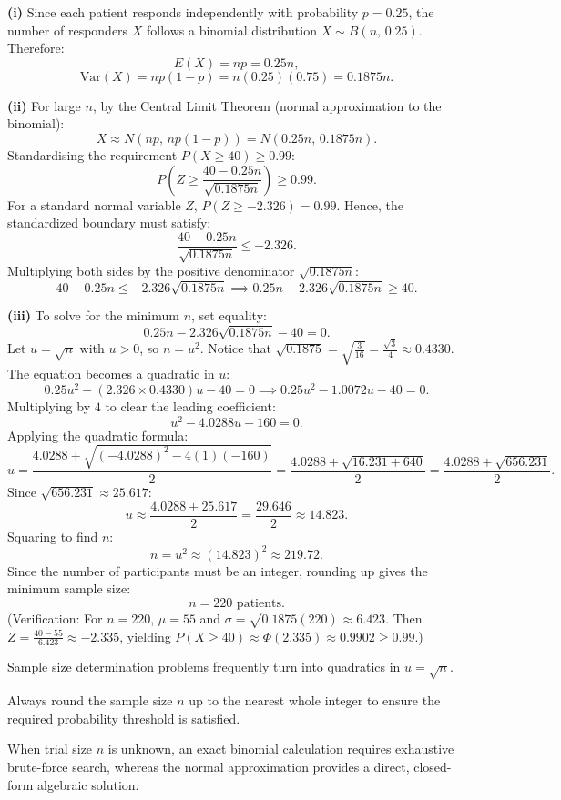 \begin{solution}
\textbf{(i)} Since each patient responds independently with probability $p = 0{.}25$, the number of responders $X$ follows a binomial distribution $X \sim B(n,\, 0{.}25)$. Therefore:
\[
E(X) = np = 0{.}25n,
\]
\[
\mathrm{Var}(X) = np(1-p) = n(0{.}25)(0{.}75) = \boxed{0{.}1875n}.
\]

\textbf{(ii)} For large $n$, by the Central Limit Theorem (normal approximation to the binomial):
\[
X \approx N(np,\, np(1-p)) = N(0{.}25n,\, 0{.}1875n).
\]
Standardising the requirement $P(X \geq 40) \geq 0{.}99$:
\[
P\!\left(Z \geq \frac{40 - 0{.}25n}{\sqrt{0{.}1875n}}\right) \geq 0{.}99.
\]
For a standard normal variable $Z$, $P(Z \geq -2{.}326) = 0{.}99$. Hence, the standardized boundary must satisfy:
\[
\frac{40 - 0{.}25n}{\sqrt{0{.}1875n}} \leq -2{.}326.
\]
Multiplying both sides by the positive denominator $\sqrt{0{.}1875n}$:
\[
40 - 0{.}25n \leq -2{.}326\sqrt{0{.}1875n} \implies 0{.}25n - 2{.}326\sqrt{0{.}1875n} \geq 40.
\]

\textbf{(iii)} To solve for the minimum $n$, set equality:
\[
0{.}25n - 2{.}326\sqrt{0{.}1875n} - 40 = 0.
\]
Let $u = \sqrt{n}$ with $u > 0$, so $n = u^2$. Notice that $\sqrt{0{.}1875} = \sqrt{\frac{3}{16}} = \frac{\sqrt{3}}{4} \approx 0{.}4330$.
The equation becomes a quadratic in $u$:
\[
0{.}25 u^2 - \left(2{.}326 \times 0{.}4330\right)u - 40 = 0 \implies 0{.}25 u^2 - 1{.}0072 u - 40 = 0.
\]
Multiplying by $4$ to clear the leading coefficient:
\[
u^2 - 4{.}0288 u - 160 = 0.
\]
Applying the quadratic formula:
\[
u = \frac{4{.}0288 + \sqrt{(-4{.}0288)^2 - 4(1)(-160)}}{2} = \frac{4{.}0288 + \sqrt{16{.}231 + 640}}{2} = \frac{4{.}0288 + \sqrt{656{.}231}}{2}.
\]
Since $\sqrt{656{.}231} \approx 25{.}617$:
\[
u \approx \frac{4{.}0288 + 25{.}617}{2} = \frac{29{.}646}{2} \approx 14{.}823.
\]
Squaring to find $n$:
\[
n = u^2 \approx (14{.}823)^2 \approx 219{.}72.
\]
Since the number of participants must be an integer, rounding up gives the minimum sample size:
\[
\boxed{n = 220\text{ patients}}.
\]
(Verification: For $n = 220$, $\mu = 55$ and $\sigma = \sqrt{0{.}1875(220)} \approx 6{.}423$. Then $Z = \frac{40 - 55}{6{.}423} \approx -2{.}335$, yielding $P(X \geq 40) \approx \Phi(2{.}335) \approx 0{.}9902 \geq 0{.}99$.)
\end{solution}

\begin{takeaways}
\item Sample size determination problems frequently turn into quadratics in $u = \sqrt{n}$.
\item Always round the sample size $n$ up to the nearest whole integer to ensure the required probability threshold is satisfied.
\item When trial size $n$ is unknown, an exact binomial calculation requires exhaustive brute-force search, whereas the normal approximation provides a direct, closed-form algebraic solution.
\end{takeaways}
